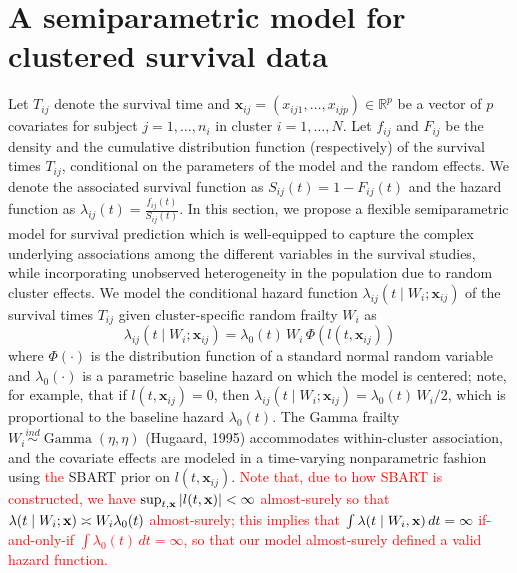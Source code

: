 \documentclass[11pt]{article}
\newcommand{\Gam}{\operatorname{Gamma}}
\newcommand{\bfx}{{\bf x}}
\begin{document}
 \normalcolor
 
 \section{A semiparametric model for clustered survival data}
 
  Let $T_{ij}$ denote the survival time and $\mathbf x_{ij} = (x_{ij1}, \ldots, x_{ijp}) \in \mathbb R^p$ be a vector of $p$ covariates for subject $j = 1,\ldots,n_i$ in cluster $i = 1,\ldots,N$. Let $f_{ij}$ and $F_{ij}$ be the density and the cumulative distribution function (respectively) of the survival times $T_{ij}$, conditional on the parameters of the model and the random effects. We denote the associated survival function as $S_{ij}(t) = 1 - F_{ij}(t)$ and the hazard function as $\lambda_{ij}(t) = \frac{f_{ij}(t)}{S_{ij}(t)}.$  In this section, we propose a flexible semiparametric model for survival prediction which is well-equipped to capture the complex underlying associations among the different variables in the survival studies, while incorporating unobserved heterogeneity in the population due to random cluster effects. We model the conditional hazard function $\lambda_{ij}(t \mid W_i; \mathbf x_{ij})$ of the survival times $T_{ij}$ given cluster-specific random frailty $W_i$ as 
  \begin{equation}
  	\lambda_{ij}(t\mid W_i;\mathbf{x}_{ij}) = \lambda_0(t) \, W_i \, \Phi(l(t, \mathbf{x}_{ij}))
  	\label{equ:model}
  \end{equation} 
where $\Phi(\cdot)$ is the distribution function of a standard normal random variable and $\lambda_0(\cdot)$ is a parametric baseline hazard on which the model is centered; note, for example, that if $l(t,\mathbf x_{ij}) = 0$, then $\lambda_{ij}(t \mid W_i; \mathbf x_{ij}) = \lambda_0(t) \, W_i / 2$, which is proportional to the baseline hazard $\lambda_0(t)$. The Gamma frailty $W_i \stackrel{ind}{\sim} \Gam(\eta,\eta)$ (Hugaard, 1995) accommodates within-cluster association, and the covariate effects are modeled in a time-varying nonparametric fashion using \textcolor{red}{the} SBART prior on $l(t, \mathbf x_{ij})$. 
\textcolor{red}{Note that, due to how SBART is constructed, we have $\sup_{t,\bfx}|l(t,\bfx)|<\infty$ almost-surely so that $\lambda(t \mid W_i; \bfx) \asymp W_i \lambda_0(t)$ almost-surely; this implies that $\int \lambda(t \mid W_i, \bfx)\, dt = \infty$ if-and-only-if $\int \lambda_0(t) \, dt = \infty$, so that our model almost-surely defined a valid hazard function.}
\end{document}
